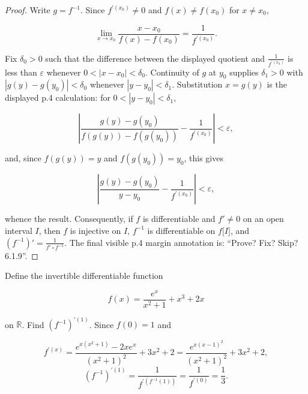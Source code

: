 \begin{proof}

Write \(g = f^{- 1}\). Since \(f^{'{(x_{0})}} \neq 0\) and \(f(x) \neq f\left( x_{0} \right)\) for \(x \neq x_{0}\),

\[\lim\limits_{x\rightarrow x_{0}}\frac{x - x_{0}}{f(x) - f\left( x_{0} \right)} = \frac{1}{f^{'{(x_{0})}}}.\]

Fix \(\delta_{0} > 0\) such that the difference between the displayed quotient and \(\frac{1}{f^{'{(x_{0})}}}\) is less than \(\varepsilon\) whenever \(0 < \left| {x - x_{0}} \right| < \delta_{0}\). Continuity of \(g\) at \(y_{0}\) supplies \(\delta_{1} > 0\) with \(\left| {g(y) - g\left( y_{0} \right)} \right| < \delta_{0}\) whenever \(\left| {y - y_{0}} \right| < \delta_{1}\). Substitution \(x = g(y)\) is the displayed p.4 calculation: for \(0 < \left| {y - y_{0}} \right| < \delta_{1}\),

\[\left| {\frac{g(y) - g\left( y_{0} \right)}{f\left( {g(y)} \right) - f\left( {g\left( y_{0} \right)} \right)} - \frac{1}{f^{'{(x_{0})}}}} \right| < \varepsilon,\]

and, since \(f\left( {g(y)} \right) = y\) and \(f\left( {g\left( y_{0} \right)} \right) = y_{0}\), this gives

\[\left| {\frac{g(y) - g\left( y_{0} \right)}{y - y_{0}} - \frac{1}{f^{'{(x_{0})}}}} \right| < \varepsilon,\]

whence the result. Consequently, if \(f\) is differentiable and \(f' \neq 0\) on an open interval \(I\), then \(f\) is injective on \(I\), \(f^{- 1}\) is differentiable on \(f\lbrack I\rbrack\), and \(\left( f^{- 1} \right)' = \frac{1}{f' \circ f^{- 1}}\). The final visible p.4 margin annotation is: ``Prove? Fix? Skip? 6.1.9''.

\end{proof}

\begin{example}

Define the invertible differentiable function

\[f(x) = \frac{e^{x}}{x^{2} + 1} + x^{3} + 2x\]

on \(\mathbb{R}\). Find \(\left( f^{- 1} \right)^{'{(1)}}\). Since \(f(0) = 1\) and

\[f^{'{(x)}} = \frac{e^{x{({x^{2} + 1})}} - 2xe^{x}}{\left( {x^{2} + 1} \right)^{2}} + 3x^{2} + 2 = \frac{e^{{x{({x - 1})}}^{2}}}{\left( {x^{2} + 1} \right)^{2}} + 3x^{2} + 2,\]\[\left( f^{- 1} \right)^{'{(1)}} = \frac{1}{f^{'{({f^{- 1}{(1)}})}}} = \frac{1}{f^{'{(0)}}} = \frac{1}{3}.\]

\end{example}

